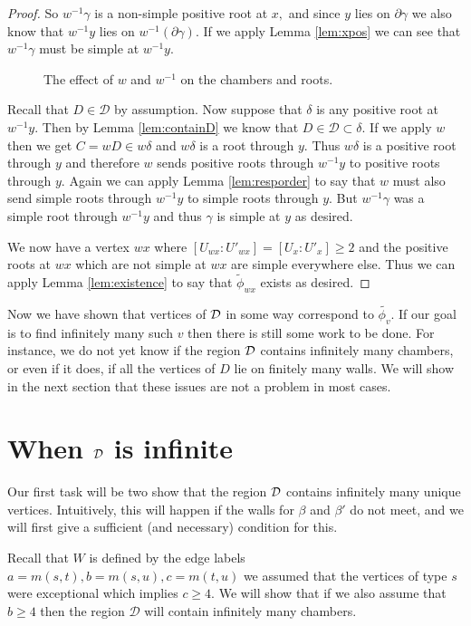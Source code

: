 \documentclass[class=book, crop=false,12 pt]{standalone}
\begin{document}
\begin{proof}
So $w^{-1}\gamma$ is a non-simple positive root at $x,$ and since $y$ lies on $\partial \gamma$ we also know that $w^{-1}y$ lies on $w^{-1}(\partial \gamma).$ If we apply Lemma \ref{lem:xpos} we can see that $w^{-1}\gamma$ must be simple at $w^{-1}y.$ 
\begin{figure}[h]
	\label{fig:mappicture}
\caption{The effect of $w$ and $w^{-1}$ on the chambers and roots.}
\end{figure}


Recall that $D\in \mathcal{D}$ by assumption. Now suppose that $\delta$ is any positive root at $w^{-1}y.$ Then by Lemma \ref{lem:containD} we know that $D\in \mathcal{D}\subset \delta.$ If we apply $w$ then we get $C=wD\in w\delta$ and $w\delta$ is a root through $y.$ Thus $w\delta$ is a positive root through $y$ and therefore $w$ sends positive roots through $w^{-1}y$ to positive roots through $y.$ Again we can apply Lemma \ref{lem:resporder} to say that $w$ must also send simple roots through $w^{-1}y$ to simple roots through $y.$ But $w^{-1}\gamma$ was a simple root through $w^{-1}y$ and thus $\gamma$ is simple at $y$ as desired.

We now have a vertex $wx$ where $[U_{wx}:U'_{wx}]=[U_x:U'_x]\ge 2$ and the positive roots at $wx$ which are not simple at $wx$ are simple everywhere else. Thus we can apply Lemma \ref{lem:existence} to say that $\tilde{\phi}_{wx}$ exists as desired.
\end{proof}

Now we have shown that vertices of $\mathcal{D}$ in some way correspond to $\tilde{\phi_v}.$ If our goal is to find infinitely many such $v$ then there is still some work to be done. For instance, we do not yet know if the region $\mathcal{D}$ contains infinitely many chambers, or even if it does, if all the vertices of $D$ lie on finitely many walls. We will show in the next section that these issues are not a problem in most cases.


\section{When $\mathcal{D}$ is infinite}
Our first task will be two show that the region $\mathcal{D}$ contains infinitely many unique vertices. Intuitively, this will happen if the walls for $\beta$ and $\beta'$ do not meet, and we will first give a sufficient (and necessary) condition for this.

Recall that $W$ is defined by the edge labels $a=m(s,t),b=m(s,u),c=m(t,u)$ we assumed that the vertices of type $s$ were exceptional which implies $c\ge 4.$ We will show that if we also assume that $b\ge 4$ then the region $\mathcal{D}$ will contain infinitely many chambers.
\end{document}
